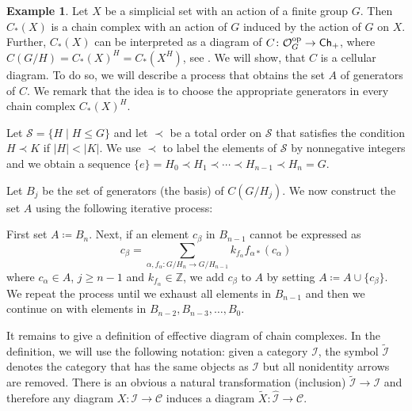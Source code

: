 \documentclass[12pt,a4wide]{article}
\theoremstyle{plain}
\theoremstyle{definition}
\newtheorem{ex}[thm]{Example}
\newcommand{\Ocat}{\mathcal{O}}
\def\S{\mathcal{S}}
\newcommand{\thedim}{{n}}
\newcommand{\thedimmm}{{j}}
\renewcommand\:{\colon}
\newcommand{\dC}{{C}}
\newcommand{\ccat}{\mathcal C}
\newcommand{\icat}{\mathcal I}
\begin{document}
\begin{ex}\label{ex:celluaction}
Let $X$ be a simplicial set with an action of a finite group $G$. Then $C_*(X)$ is a chain complex with an action of $G$ induced by the action of $G$ on $X$. Further,  $C_*(X)$ can be interpreted as a diagram of $\dC\: \Ocat_G ^\op \to \Ch_+$, where $\dC(G/H) = C_*(X) ^H = C_*(X^H)$, see \cite{elemndorf}. We will show, that  $\dC$ is a cellular diagram. To do so, we will describe a process that obtains the set $A$ of generators of $\dC$. We remark that the idea is to choose the appropriate generators in every  chain complex $C_*(X) ^H$. 

Let $\S = \{ H \mid H\leq G\}$ and let $\prec$ be a total order on $\S$ that satisfies the condition $H\prec K$ if $|H| < |K|$. We use  $\prec$ to label the elements of $\S$ by nonnegative integers and we obtain a sequence
$\{e\} = H_0 \prec H_1 \prec \cdots \prec H_{\thedim-1} \prec H_\thedim = G$.

Let $B_\thedimmm$ be the set of generators (the basis) of $\dC(G/H_{\thedimmm})$. 
We now construct the set $A$ using the following iterative process:

First set $A  \coloneqq B_\thedim$. Next, if an element $c_\beta$ in $B_{\thedim -1}$ cannot be expressed as
\begin{equation*}
c_\beta= \sum\limits_{\alpha, f_{\alpha}\: G/H_{\thedim} \to G/H_{\thedim -1}} k_{f_{\alpha}} f_{\alpha*} (c_\alpha)
\end{equation*}
where $c_\alpha \in A$, $\thedimmm \geq {\thedim -1}$ and  $k_{f_\alpha} \in \mathbb{Z}$, we add $c_\beta$ to $A$ by setting $A \coloneqq A \cup \{ c_\beta \}$. 
We repeat the process until we exhaust all elements in $B_{\thedim -1}$ and then we continue on with elements in $B_{\thedim- 2}, B_{\thedim -3}, \ldots,  B_0$.
\end{ex}

It remains to give a definition of effective diagram of chain complexes. In the definition, we will use the following notation:
given a category $\icat$, the symbol $\widetilde{\icat}$ denotes the category that has the same objects as $\icat$ but all nonidentity arrows are removed. There is an obvious a natural transformation (inclusion) $\widetilde{\icat} \to \icat$ and therefore any diagram $X \: \icat \to \ccat$ induces a diagram $\widetilde{X} \:  \widehat{\icat}\to \ccat$.
\end{document}
